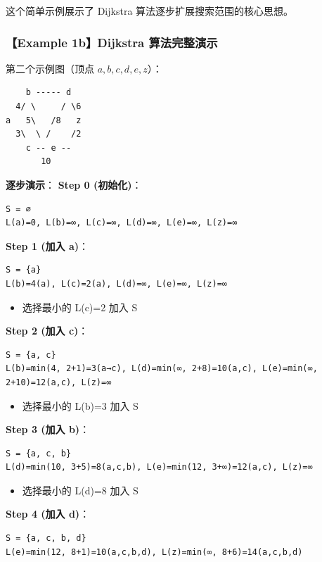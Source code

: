 \documentclass[10pt,a4paper,openany]{ctexbook}
\theoremstyle{definition}
\theoremstyle{remark}
\begin{document}
这个简单示例展示了 Dijkstra 算法逐步扩展搜索范围的核心思想。
\vspace{-2pt}

\subsubsection{【Example 1b】Dijkstra 算法完整演示}

第二个示例图（顶点 $a, b, c, d, e, z$）：
{\footnotesize\begin{verbatim}
    b ----- d
  4/ \     / \6
a   5\   /8   z
  3\  \ /    /2
    c -- e --
       10
\end{verbatim}}

\textbf{逐步演示}：
\textbf{Step 0 (初始化)}：
{\footnotesize\begin{verbatim}
S = ∅
L(a)=0, L(b)=∞, L(c)=∞, L(d)=∞, L(e)=∞, L(z)=∞
\end{verbatim}}

\textbf{Step 1 (加入 a)}：
{\footnotesize\begin{verbatim}
S = {a}
L(b)=4(a), L(c)=2(a), L(d)=∞, L(e)=∞, L(z)=∞
\end{verbatim}}

\begin{itemize}
\item 选择最小的 L(c)=2 加入 S

\end{itemize}

\textbf{Step 2 (加入 c)}：
{\footnotesize\begin{verbatim}
S = {a, c}
L(b)=min(4, 2+1)=3(a→c), L(d)=min(∞, 2+8)=10(a,c), L(e)=min(∞, 2+10)=12(a,c), L(z)=∞
\end{verbatim}}

\begin{itemize}
\item 选择最小的 L(b)=3 加入 S

\end{itemize}

\textbf{Step 3 (加入 b)}：
{\footnotesize\begin{verbatim}
S = {a, c, b}
L(d)=min(10, 3+5)=8(a,c,b), L(e)=min(12, 3+∞)=12(a,c), L(z)=∞
\end{verbatim}}

\begin{itemize}
\item 选择最小的 L(d)=8 加入 S

\end{itemize}

\textbf{Step 4 (加入 d)}：
{\footnotesize\begin{verbatim}
S = {a, c, b, d}
L(e)=min(12, 8+1)=10(a,c,b,d), L(z)=min(∞, 8+6)=14(a,c,b,d)
\end{verbatim}}
\end{document}
